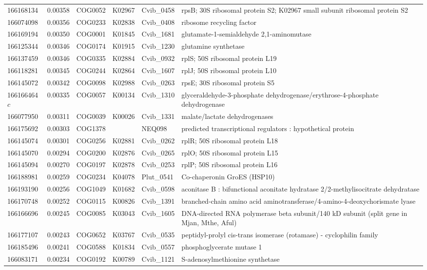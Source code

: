 \begin{landscape}
\begin{longtable}{p{1.6cm}p{1.2cm}p{1.5cm}p{1.5cm}p{2.8cm}p{13.5cm}}
166168134&0.00358&COG0052&K02967&Cvib\_0458&rpsB; 30S ribosomal protein S2; K02967 small subunit ribosomal protein S2 \\
166074098&0.00356&COG0233&K02838&Cvib\_0408&ribosome recycling factor \\
166169194&0.00350&COG0001&K01845&Cvib\_1681&glutamate-1-semialdehyde 2,1-aminomutase \\
166125344&0.00346&COG0174&K01915&Cvib\_1230&glutamine synthetase \\
166137459&0.00346&COG0335&K02884&Cvib\_0932&rplS; 50S ribosomal protein L19 \\
166118281&0.00345&COG0244&K02864&Cvib\_1607&rplJ; 50S ribosomal protein L10 \\
166145072&0.00342&COG0098&K02988&Cvib\_0263&rpsE; 30S ribosomal protein S5 \\
166166464$c$&0.00335&COG0057&K00134&Cvib\_1310&glyceraldehyde-3-phosphate dehydrogenase/erythrose-4-phosphate dehydrogenase \\
166077950&0.00311&COG0039&K00026&Cvib\_1331&malate/lactate dehydrogenases \\
166175692&0.00303&COG1378&&NEQ098&predicted transcriptional regulators : hypothetical protein \\
166145074&0.00301&COG0256&K02881&Cvib\_0262&rplR; 50S ribosomal protein L18 \\
166145070&0.00294&COG0200&K02876&Cvib\_0265&rplO; 50S ribosomal protein L15 \\
166145094&0.00270&COG0197&K02878&Cvib\_0253&rplP; 50S ribosomal protein L16 \\
166188981&0.00259&COG0234&K04078&Plut\_0541&Co-chaperonin GroES (HSP10) \\
166193190&0.00256&COG1049&K01682&Cvib\_0598&aconitase B : bifunctional aconitate hydratase 2/2-methylisocitrate dehydratase \\
166170748&0.00252&COG0115&K00826&Cvib\_1391&branched-chain amino acid aminotransferase/4-amino-4-deoxychorismate lyase \\
166166696&0.00245&COG0085&K03043&Cvib\_1605&DNA-directed RNA polymerase beta subunit/140 kD subunit (split gene in Mjan, Mthe, Aful) \\
166177107&0.00243&COG0652&K03767&Cvib\_0535&peptidyl-prolyl cis-trans isomerase (rotamase) - cyclophilin family \\
166185496&0.00241&COG0588&K01834&Cvib\_0557&phosphoglycerate mutase 1 \\
166083171&0.00234&COG0192&K00789&Cvib\_1121&S-adenosylmethionine synthetase \\

\end{longtable}
\end{landscape}
